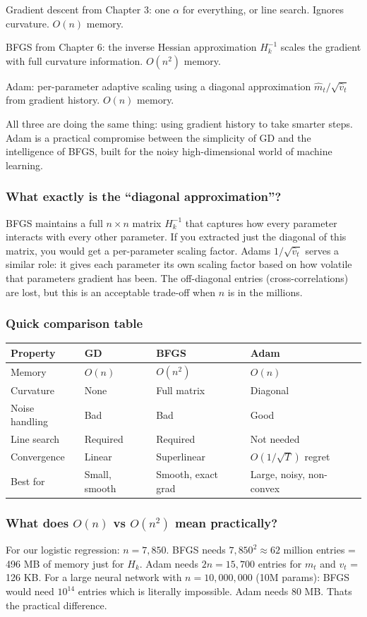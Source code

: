 \documentclass[11pt, letterpaper]{article}
\begin{document}
Gradient descent from Chapter 3: one $\alpha$ for everything, or line search. Ignores curvature. $O(n)$ memory.

BFGS from Chapter 6: the inverse Hessian approximation $H_k^{-1}$ scales the gradient with full curvature information. $O(n^2)$ memory.

Adam: per-parameter adaptive scaling using a diagonal approximation $\hat{m}_t / \sqrt{\hat{v}_t}$ from gradient history. $O(n)$ memory.

All three are doing the same thing: using gradient history to take smarter steps. Adam is a practical compromise between the simplicity of GD and the intelligence of BFGS, built for the noisy high-dimensional world of machine learning.

\begin{deepdive}
\subsubsection{What exactly is the ``diagonal approximation''?}
BFGS maintains a full $n \times n$ matrix $H_k^{-1}$ that captures how every parameter interacts with every other parameter. If you extracted just the diagonal of this matrix, you would get a per-parameter scaling factor. Adams $1/\sqrt{\hat{v}_t}$ serves a similar role: it gives each parameter its own scaling factor based on how volatile that parameters gradient has been. The off-diagonal entries (cross-correlations) are lost, but this is an acceptable trade-off when $n$ is in the millions.

\subsubsection{Quick comparison table}

\begin{tabularx}{\textwidth}{l X X X}
\textbf{Property} & \textbf{GD} & \textbf{BFGS} & \textbf{Adam} \\
\hline
Memory & $O(n)$ & $O(n^2)$ & $O(n)$ \\
Curvature & None & Full matrix & Diagonal \\
Noise handling & Bad & Bad & Good \\
Line search & Required & Required & Not needed \\
Convergence & Linear & Superlinear & $O(1/\sqrt{T})$ regret \\
Best for & Small, smooth & Smooth, exact grad & Large, noisy, non-convex \\
\end{tabularx}

\subsubsection{What does $O(n)$ vs $O(n^2)$ mean practically?}
For our logistic regression: $n = 7{,}850$. BFGS needs $7{,}850^2 \approx 62$ million entries = 496 MB of memory just for $H_k$. Adam needs $2n = 15{,}700$ entries for $m_t$ and $v_t$ = 126 KB. For a large neural network with $n = 10{,}000{,}000$ (10M params): BFGS would need $10^{14}$ entries which is literally impossible. Adam needs 80 MB. Thats the practical difference.
\end{deepdive}
\end{document}
